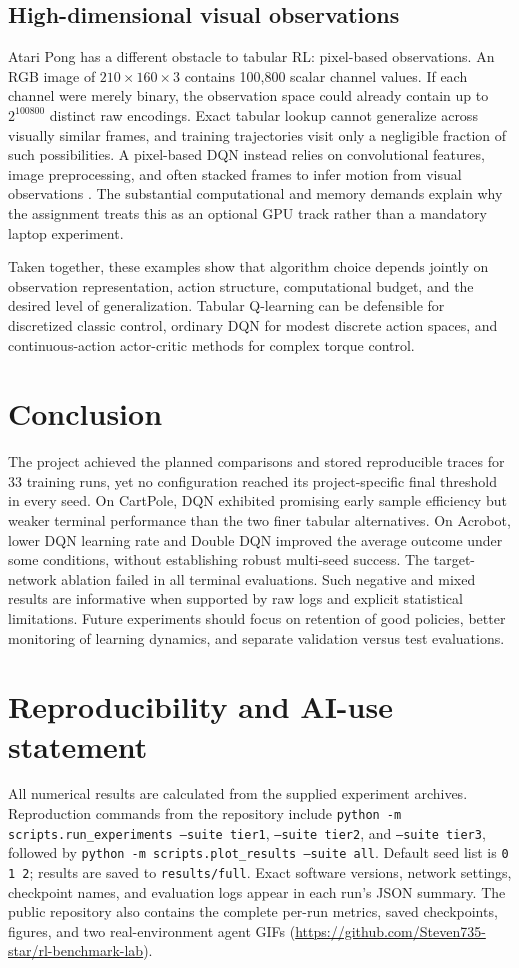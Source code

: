 \documentclass[a4paper,10pt,twocolumn]{article}
\begin{document}
\subsection{High-dimensional visual observations}
Atari Pong has a different obstacle to tabular RL: pixel-based observations. An RGB image of $210\times160\times3$ contains 100,800 scalar channel values. If each channel were merely binary, the observation space could already contain up to $2^{100800}$ distinct raw encodings. Exact tabular lookup cannot generalize across visually similar frames, and training trajectories visit only a negligible fraction of such possibilities. A pixel-based DQN instead relies on convolutional features, image preprocessing, and often stacked frames to infer motion from visual observations \cite{mnih2015,aledocs}. The substantial computational and memory demands explain why the assignment treats this as an optional GPU track rather than a mandatory laptop experiment.

Taken together, these examples show that algorithm choice depends jointly on observation representation, action structure, computational budget, and the desired level of generalization. Tabular Q-learning can be defensible for discretized classic control, ordinary DQN for modest discrete action spaces, and continuous-action actor-critic methods for complex torque control.

\section{Conclusion}
The project achieved the planned comparisons and stored reproducible traces for 33 training runs, yet no configuration reached its project-specific final threshold in every seed. On CartPole, DQN exhibited promising early sample efficiency but weaker terminal performance than the two finer tabular alternatives. On Acrobot, lower DQN learning rate and Double DQN improved the average outcome under some conditions, without establishing robust multi-seed success. The target-network ablation failed in all terminal evaluations. Such negative and mixed results are informative when supported by raw logs and explicit statistical limitations. Future experiments should focus on retention of good policies, better monitoring of learning dynamics, and separate validation versus test evaluations.

\section*{Reproducibility and AI-use statement}
All numerical results are calculated from the supplied experiment archives. Reproduction commands from the repository include \texttt{python -m scripts.run\_experiments --suite tier1}, \texttt{--suite tier2}, and \texttt{--suite tier3}, followed by \texttt{python -m scripts.plot\_results --suite all}. Default seed list is \texttt{0 1 2}; results are saved to \texttt{results/full}. Exact software versions, network settings, checkpoint names, and evaluation logs appear in each run's JSON summary. The public repository also contains the complete per-run metrics, saved checkpoints, figures, and two real-environment agent GIFs (\url{https://github.com/Steven735-star/rl-benchmark-lab}).
\end{document}
